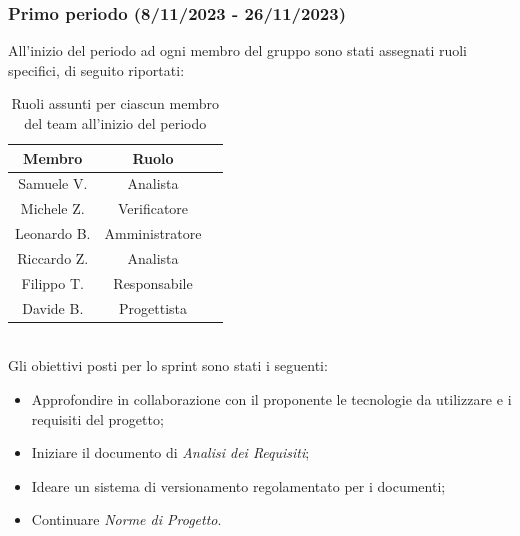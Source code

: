 \subsubsection{Primo periodo (8/11/2023 - 26/11/2023)}

All'inizio del periodo ad ogni membro del gruppo sono stati assegnati ruoli specifici, di seguito riportati:
\begin{table}[H]
\centering
\begin{tabular}{|c|c|c|}
\hline
\textbf{Membro} & \textbf{Ruolo} \\
\hline
Samuele V. & Analista \\
\hline
Michele Z. & Verificatore \\
\hline
Leonardo B. & Amministratore \\
\hline
Riccardo Z. & Analista \\
\hline
Filippo T. & Responsabile \\
\hline
Davide B. & Progettista \\
\hline
\end{tabular}
\caption{Ruoli assunti per ciascun membro del team all'inizio del periodo}
\end{table}
\\
Gli obiettivi posti per lo sprint sono stati i seguenti:
\begin{itemize}
    \item Approfondire in collaborazione con il proponente le tecnologie da utilizzare e i requisiti del progetto;
    \item Iniziare il documento di \emph{Analisi dei Requisiti};
    \item Ideare un sistema di versionamento regolamentato per i documenti;
    \item Continuare \emph{Norme di Progetto}.
\end{itemize}

